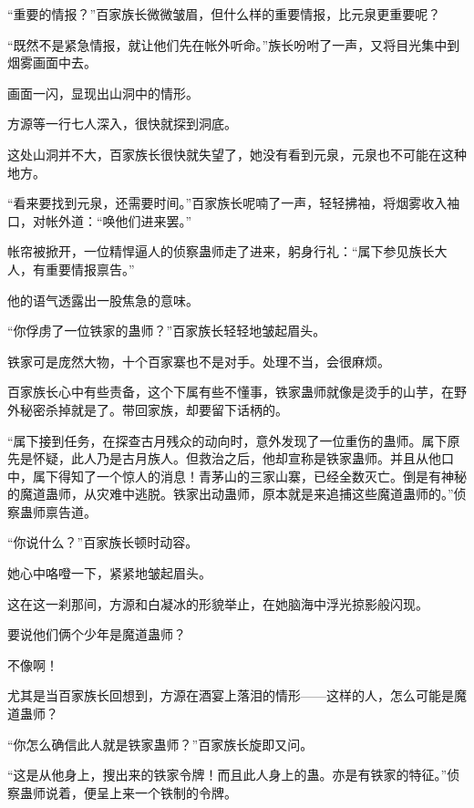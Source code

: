 
\begin{this_body}



“重要的情报？”百家族长微微皱眉，但什么样的重要情报，比元泉更重要呢？

“既然不是紧急情报，就让他们先在帐外听命。”族长吩咐了一声，又将目光集中到烟雾画面中去。

画面一闪，显现出山洞中的情形。

方源等一行七人深入，很快就探到洞底。

这处山洞并不大，百家族长很快就失望了，她没有看到元泉，元泉也不可能在这种地方。

“看来要找到元泉，还需要时间。”百家族长呢喃了一声，轻轻拂袖，将烟雾收入袖口，对帐外道：“唤他们进来罢。”

帐帘被掀开，一位精悍逼人的侦察蛊师走了进来，躬身行礼：“属下参见族长大人，有重要情报禀告。”

他的语气透露出一股焦急的意味。

“你俘虏了一位铁家的蛊师？”百家族长轻轻地皱起眉头。

铁家可是庞然大物，十个百家寨也不是对手。处理不当，会很麻烦。

百家族长心中有些责备，这个下属有些不懂事，铁家蛊师就像是烫手的山芋，在野外秘密杀掉就是了。带回家族，却要留下话柄的。

“属下接到任务，在探查古月残众的动向时，意外发现了一位重伤的蛊师。属下原先是怀疑，此人乃是古月族人。但救治之后，他却宣称是铁家蛊师。并且从他口中，属下得知了一个惊人的消息！青茅山的三家山寨，已经全数灭亡。倒是有神秘的魔道蛊师，从灾难中逃脱。铁家出动蛊师，原本就是来追捕这些魔道蛊师的。”侦察蛊师禀告道。

“你说什么？”百家族长顿时动容。

她心中咯噔一下，紧紧地皱起眉头。

这在这一刹那间，方源和白凝冰的形貌举止，在她脑海中浮光掠影般闪现。

要说他们俩个少年是魔道蛊师？

不像啊！

尤其是当百家族长回想到，方源在酒宴上落泪的情形——这样的人，怎么可能是魔道蛊师？

“你怎么确信此人就是铁家蛊师？”百家族长旋即又问。

“这是从他身上，搜出来的铁家令牌！而且此人身上的蛊。亦是有铁家的特征。”侦察蛊师说着，便呈上来一个铁制的令牌。


\end{this_body}
